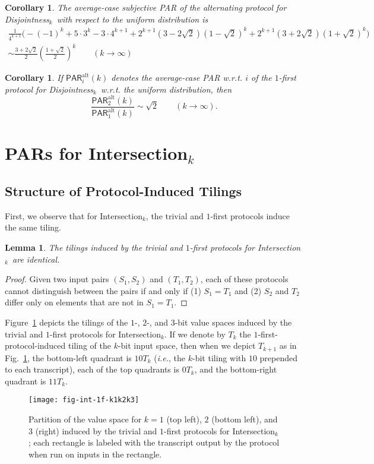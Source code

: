 \documentclass{article}
\theoremstyle{theorem}
\newtheorem{cor}[theorem]{Corollary}
\newtheorem{lemma}[theorem]{Lemma}
\theoremstyle{definition}
\theoremstyle{remark}
\newcommand{\ie}{\emph{i.e.}}
\newcommand{\PAR}{\ensuremath{\mathsf{PAR}}}
\newcommand{\disjoint}{{\sc Dis\-joint\-ness}\ensuremath{_k}}
\newcommand{\intersection}{{\sc In\-ter\-sec\-tion}\ensuremath{_k}}
\begin{document}
\begin{cor}
The average-case subjective PAR of the alternating protocol for \disjoint\ with respect to the uniform distribution is
\begin{multline*}
\frac{1}{4^{k+1}}\bigg(-(-1)^k + 5\cdot 3^k - 3\cdot 4^{k+1}
    + 2^{k+1}(3-2\sqrt{2})(1-\sqrt{2})^k + 2^{k+1}(3+2\sqrt{2})(1+\sqrt{2})^k\bigg)\\
    \sim \frac{3+2\sqrt{2}}{2}\left(\frac{1+\sqrt{2}}{2}\right)^k \qquad (k\rightarrow \infty)
\end{multline*}
\end{cor}

\begin{cor}
If $\PAR^\mathrm{alt}_i(k)$ denotes the average-case PAR w.r.t. $i$ of the $1$-first protocol for \disjoint\ w.r.t. the uniform distribution, then
\[
\frac{\PAR^\mathrm{alt}_2(k)}{\PAR^\mathrm{alt}_1(k)} \sim \sqrt{2}\qquad (k\rightarrow\infty).
\]
\end{cor}


\section{PARs for \intersection}\label{sec:intersection}


\subsection{Structure of Protocol-Induced Tilings}


First, we observe that for \intersection, the trivial and $1$-first protocols induce the same tiling.
\begin{lemma}\label{lem:int-triv1first}
The tilings induced by the trivial and $1$-first protocols for \intersection\ are identical.
\end{lemma}
\begin{proof}
Given two input pairs $(S_1,S_2)$ and $(T_1,T_2)$, each of these protocols cannot distinguish between the pairs if and only if (1) $S_1=T_1$ and (2) $S_2$ and $T_2$ differ only on elements that are not in $S_1=T_1$.
\end{proof}

Figure~\ref{fig:int-1f-k1k2k3} depicts the tilings of the $1$-, $2$-, and $3$-bit value spaces induced by the trivial and $1$-first protocols for \intersection.  If we denote by $T_k$ the $1$-first-protocol-induced tiling of the $k$-bit input space, then when we depict $T_{k+1}$ as in Fig.~\ref{fig:int-1f-k1k2k3}, the bottom-left quadrant is $10T_k$ (\ie, the $k$-bit tiling with $10$ prepended to each transcript), each of the top quadrants is $0T_k$, and the bottom-right quadrant is $11T_k$.
\begin{figure}[htp]
\begin{center}
\texttt{[image: fig-int-1f-k1k2k3]}
\caption{Partition of the value space for $k=1$ (top left), $2$ (bottom left), and $3$ (right) induced by the trivial and $1$-first protocols for \intersection; each rectangle is labeled with the transcript output by the protocol when run on inputs in the rectangle.}\label{fig:int-1f-k1k2k3}
\end{center}
\end{figure}
\end{document}
